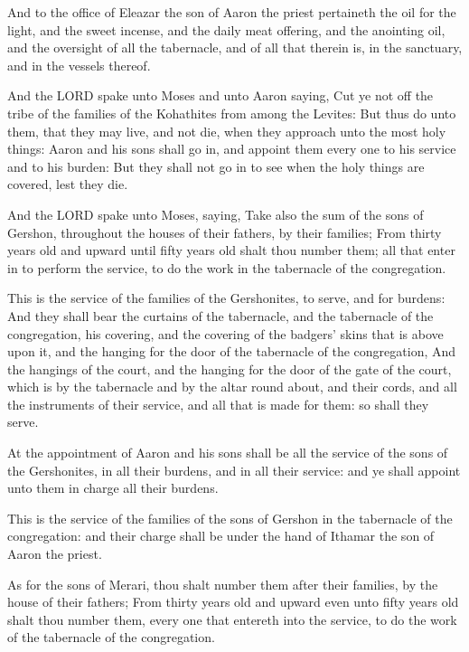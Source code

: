 \Verse And to the office of Eleazar the son of Aaron the priest
pertaineth the oil for the light, and the sweet incense, and the daily
meat offering, and the anointing oil, and the oversight of all the
tabernacle, and of all that therein is, in the sanctuary, and in the
vessels thereof.

\Verse And the LORD spake unto Moses and unto Aaron saying, \Verse Cut ye
not off the tribe of the families of the Kohathites from among the
Levites: \Verse But thus do unto them, that they may live, and not die,
when they approach unto the most holy things: Aaron and his sons shall
go in, and appoint them every one to his service and to his burden:
\Verse But they shall not go in to see when the holy things are covered,
lest they die.

\Verse And the LORD spake unto Moses, saying, \Verse Take also the sum of
the sons of Gershon, throughout the houses of their fathers, by their
families; \Verse From thirty years old and upward until fifty years old
shalt thou number them; all that enter in to perform the service, to
do the work in the tabernacle of the congregation.

\Verse This is the service of the families of the Gershonites, to serve,
and for burdens: \Verse And they shall bear the curtains of the
tabernacle, and the tabernacle of the congregation, his covering, and
the covering of the badgers' skins that is above upon it, and the
hanging for the door of the tabernacle of the congregation, \Verse And
the hangings of the court, and the hanging for the door of the gate of
the court, which is by the tabernacle and by the altar round about,
and their cords, and all the instruments of their service, and all
that is made for them: so shall they serve.

\Verse At the appointment of Aaron and his sons shall be all the service
of the sons of the Gershonites, in all their burdens, and in all their
service: and ye shall appoint unto them in charge all their burdens.

\Verse This is the service of the families of the sons of Gershon in the
tabernacle of the congregation: and their charge shall be under the
hand of Ithamar the son of Aaron the priest.

\Verse As for the sons of Merari, thou shalt number them after their
families, by the house of their fathers; \Verse From thirty years old
and upward even unto fifty years old shalt thou number them, every one
that entereth into the service, to do the work of the tabernacle of
the congregation.

